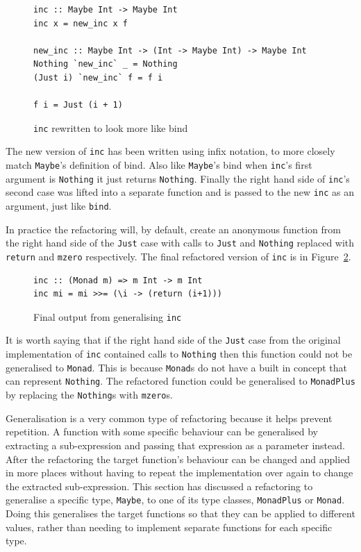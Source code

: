 \begin{figure}[t]
\begin{lstlisting}
inc :: Maybe Int -> Maybe Int
inc x = new_inc x f

new_inc :: Maybe Int -> (Int -> Maybe Int) -> Maybe Int
Nothing `new_inc` _ = Nothing
(Just i) `new_inc` f = f i

f i = Just (i + 1)
\end{lstlisting}
\caption{\texttt{inc} rewritten to look more like bind}
\label{incRewrite}
\end{figure}

The new version of \texttt{inc} has been written using infix notation, to more closely match \texttt{Maybe}'s definition of bind. Also like \texttt{Maybe}'s bind when \texttt{inc}'s first argument is \texttt{Nothing} it just returns \texttt{Nothing}. Finally the right hand side of \texttt{inc}'s second case was lifted into a separate function and is passed to the new \texttt{inc} as an argument, just like \texttt{bind}.

In practice the refactoring will, by default, create an anonymous function from the right hand side of the \texttt{Just} case with calls to \texttt{Just} and \texttt{Nothing} replaced with \texttt{return} and \texttt{mzero} respectively. The final refactored version of \texttt{inc} is in Figure~\ref{mmp1Ref}.

\begin{figure}[t]
\begin{lstlisting}
inc :: (Monad m) => m Int -> m Int
inc mi = mi >>= (\i -> (return (i+1)))
\end{lstlisting}
\caption{Final output from generalising \texttt{inc}}
\label{mmp1Ref}
\end{figure}

It is worth saying that if the right hand side of the \texttt{Just} case from the original implementation of \texttt{inc} contained calls to \texttt{Nothing} then this function could not be generalised to \texttt{Monad}. This is because \texttt{Monad}s do not have a built in concept that can represent \texttt{Nothing}. The refactored function could be generalised to \texttt{MonadPlus} by replacing the \texttt{Nothing}s with \texttt{mzero}s.

Generalisation is a very common type of refactoring because it helps prevent repetition. A function with some specific behaviour can be generalised by extracting a sub-expression and passing that expression as a parameter instead. After the refactoring the target function's behaviour can be changed and applied in more places without having to repeat the implementation over again to change the extracted sub-expression. This section has discussed a refactoring to generalise a specific type, \texttt{Maybe}, to one of its type classes, \texttt{MonadPlus} or \texttt{Monad}. Doing this generalises the target functions so that they can be applied to different values, rather than needing to implement separate functions for each specific type.
 
